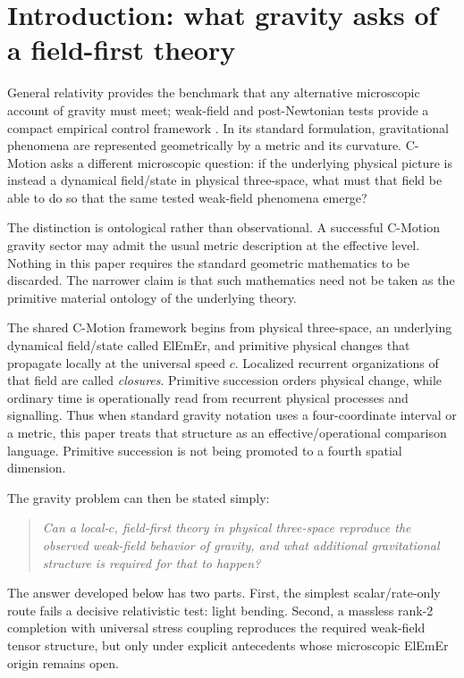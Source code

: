 \documentclass[11pt]{article}
\newcommand{\cmotion}{\mbox{C-Motion}}
\newcommand{\ElEmEr}{\mbox{ElEmEr}}
\theoremstyle{plain}
\theoremstyle{remark}
\begin{document}
\section{Introduction: what gravity asks of a field-first theory}
\label{sec:introduction}

General relativity provides the benchmark that any alternative microscopic account of
gravity must meet; weak-field and post-Newtonian tests provide a compact empirical control framework \cite{Will2014Confrontation}.  In its standard formulation, gravitational phenomena are represented
geometrically by a metric and its curvature.  \cmotion{} asks a different microscopic
question: if the underlying physical picture is instead a dynamical field/state in
physical three-space, what must that field be able to do so that the same tested
weak-field phenomena emerge?

The distinction is ontological rather than observational.  A successful \cmotion{}
gravity sector may admit the usual metric description at the effective level.  Nothing
in this paper requires the standard geometric mathematics to be discarded.  The narrower
claim is that such mathematics need not be taken as the primitive material ontology of
the underlying theory.

The shared \cmotion{} framework begins from physical three-space, an underlying dynamical
field/state called \ElEmEr{}, and primitive physical changes that propagate locally at the
universal speed $c$.  Localized recurrent organizations of that field are called
\emph{closures}.  Primitive succession orders physical change, while ordinary time is
operationally read from recurrent physical processes and signalling.  Thus when standard
gravity notation uses a four-coordinate interval or a metric, this paper treats that
structure as an effective/operational comparison language.  Primitive succession is not
being promoted to a fourth spatial dimension.

The gravity problem can then be stated simply:
\begin{quote}
\emph{Can a local-$c$, field-first theory in physical three-space reproduce the observed
weak-field behavior of gravity, and what additional gravitational structure is required
for that to happen?}
\end{quote}

The answer developed below has two parts.  First, the simplest scalar/rate-only route
fails a decisive relativistic test: light bending.  Second, a massless rank-2 completion
with universal stress coupling reproduces the required weak-field tensor structure, but
only under explicit antecedents whose microscopic \ElEmEr{} origin remains open.
\end{document}

